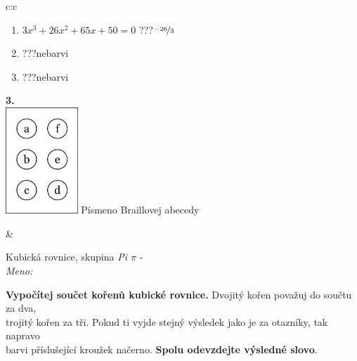 \documentclass[10pt]{report}
\begin{document}
\begin{tabular}{c:c}
\begin{minipage}[c][104.5mm][t]{0.5\linewidth}
\begin{center}
\begin{minipage}{0.79\linewidth}
\begin{center}
\begin{varwidth}{\linewidth}
\begin{enumerate}
\item $3x^3+26x^2+65x+50=0$\quad \dotfill\; ???\;\dotfill \quad $\nicefrac{-26}{3}$
\item \quad \dotfill\; ???\;\dotfill \quad nebarvi
\item \quad \dotfill\; ???\;\dotfill \quad nebarvi
\end{enumerate}
\end{varwidth}
\end{center}
\end{minipage}
\begin{minipage}{0.20\linewidth}
\begin{center}
{\Huge\bfseries 3.} \\[2mm]
\includegraphics[height=40mm]{../images/braille.png}
{\small Písmeno Braillovej abecedy}
\end{center}
\end{minipage}
\end{center}
\end{minipage}
&
\begin{minipage}[c][104.5mm][t]{0.5\linewidth}
\begin{center}
\vspace{7mm}
{\huge Kubická rovnice, skupina \textit{Pi $\pi$} -}\\[5mm]
\textit{Meno:}\phantom{xxxxxxxxxxxxxxxxxxxxxxxxxxxxxxxxxxxxxxxxxxxxxxxxxxxxxxxxxxxxxxxxx}\\[5mm]
\begin{minipage}{0.95\linewidth}
\textbf{Vypočítej součet kořenů kubické rovnice.} Dvojitý kořen považuj do součtu za dva,\\trojitý kořen za tři. Pokud ti vyjde stejný výsledek jako je za otazníky, tak napravo\\barvi příslušející kroužek načerno. \textbf{Spolu odevzdejte výsledné slovo}.
\end{minipage}
\\[1mm]
\begin{minipage}{0.79\linewidth}
\begin{center}
\begin{varwidth}{\linewidth}

\end{varwidth}
\end{center}
\end{minipage}
\end{center}
\end{minipage}
\end{tabular}
\end{document}

